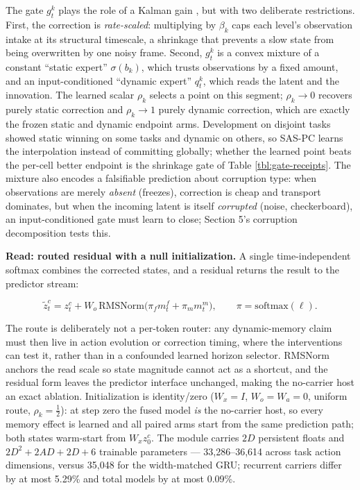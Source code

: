 The gate \(g_t^k\) plays the role of a Kalman gain \citep{ref12},
but with two deliberate restrictions. First, the correction is
\emph{rate-scaled}: multiplying by \(\beta_k\) caps each level's
observation intake at its structural timescale, a shrinkage that
prevents a slow state from being overwritten by one noisy frame. Second,
\(g_t^k\) is a convex mixture of a constant ``static expert''
\(\sigma(b_k)\), which trusts observations by a fixed amount, and an
input-conditioned ``dynamic expert'' \(q_t^k\), which reads the
latent and the innovation. The learned scalar \(\rho_k\) selects a
point on this segment; \(\rho_k\to0\) recovers purely static correction
and \(\rho_k\to1\) purely dynamic correction, which are exactly the
frozen static and dynamic endpoint arms. Development on disjoint tasks
showed static winning on some tasks and dynamic on others, so SAS-PC
learns the interpolation instead of committing globally; whether the
learned point beats the per-cell better endpoint is the shrinkage gate
of Table \ref{tbl:gate-receipts}. The mixture also encodes a falsifiable
prediction about corruption type: when observations are merely
\emph{absent} (freezes), correction is cheap and transport dominates,
but when the incoming latent is itself \emph{corrupted} (noise,
checkerboard), an input-conditioned gate must learn to close; Section
5's corruption decomposition tests this.

\textbf{Read: routed residual with a null initialization.} A single
time-independent softmax combines the corrected states, and a residual
returns the result to the predictor stream:

\begin{equation}\tilde z_t^c=z_t^c+W_o\,\mathrm{RMSNorm}\big(\pi_fm_t^f+\pi_mm_t^m\big),\qquad \pi=\mathrm{softmax}(\ell).
\label{eq:read}\end{equation}

The route is deliberately not a per-token router: any dynamic-memory
claim must then live in action evolution or correction timing, where the
interventions can test it, rather than in a confounded learned horizon
selector. RMSNorm anchors the read scale so state magnitude cannot act
as a shortcut, and the residual form leaves the predictor interface
unchanged, making the no-carrier host an exact ablation. Initialization
is identity/zero (\(W_x=I\), \(W_o=W_a=0\), uniform route,
\(\rho_k=\tfrac12\)): at step zero the fused model \emph{is} the no-carrier
host, so every memory effect is learned and all paired arms start from
the same prediction path; both states warm-start from \(W_xz_0^c\). The
module carries \(2D\) persistent floats and \(2D^2+2AD+2D+6\)
trainable parameters --- 33,286--36,614 across task action dimensions,
versus 35,048 for the width-matched GRU; recurrent carriers differ by at
most 5.29\% and total models by at most 0.09\%.

